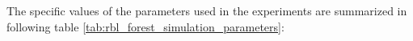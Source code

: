             The specific values of the parameters used in the experiments are summarized in following table \ref{tab:rbl_forest_simulation_parameters}:



